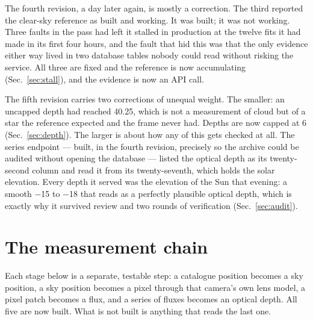 \documentclass[11pt,a4paper]{article}
\begin{document}
\noindent The fourth revision, a day later again, is mostly a correction. The
third reported the clear-sky reference as built and working. It was built; it
was not working. Three faults in the pass had left it stalled in production at
the twelve fits it had made in its first four hours, and the fault that hid this
was that the only evidence either way lived in two database tables nobody could
read without risking the service. All three are fixed and the reference is now
accumulating (Sec.~\ref{sec:stall}), and the evidence is now an API call.

\noindent The fifth revision carries two corrections of unequal weight. The
smaller: an uncapped depth had reached \num{40.25}, which is not a measurement
of cloud but of a star the reference expected and the frame never had. Depths
are now capped at 6 (Sec.~\ref{sec:depth}). The larger is about how any of
this gets checked at all. The series endpoint --- built, in the fourth
revision, precisely so the archive could be audited without opening the
database --- listed the optical depth as its twenty-second column and read it
from its twenty-seventh, which holds the solar elevation. Every depth it served
was the elevation of the Sun that evening: a smooth \num{-15} to \num{-18}
that reads as a perfectly plausible optical depth, which is exactly why it
survived review and two rounds of verification (Sec.~\ref{sec:audit}).

\section{The measurement chain}

Each stage below is a separate, testable step: a catalogue position becomes a
sky position, a sky position becomes a pixel through that camera's own lens
model, a pixel patch becomes a flux, and a series of fluxes becomes an optical
depth. All five are now built. What is not built is anything that reads the
last one.
\end{document}
